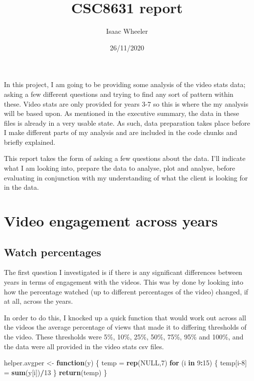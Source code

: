 \documentclass[
]{article}
\title{CSC8631 report}
\author{Isaac Wheeler}
\date{26/11/2020}
\newenvironment{Shaded}{\begin{snugshade}}{\end{snugshade}}
\newcommand{\ControlFlowTok}[1]{\textcolor[rgb]{0.13,0.29,0.53}{\textbf{#1}}}
\newcommand{\DecValTok}[1]{\textcolor[rgb]{0.00,0.00,0.81}{#1}}
\newcommand{\KeywordTok}[1]{\textcolor[rgb]{0.13,0.29,0.53}{\textbf{#1}}}
\newcommand{\NormalTok}[1]{#1}
\newcommand{\OperatorTok}[1]{\textcolor[rgb]{0.81,0.36,0.00}{\textbf{#1}}}
\newcommand{\OtherTok}[1]{\textcolor[rgb]{0.56,0.35,0.01}{#1}}
\newcommand{\StringTok}[1]{\textcolor[rgb]{0.31,0.60,0.02}{#1}}
\begin{document}
\maketitle

In this project, I am going to be providing some analysis of the video
stats data; asking a few different questions and trying to find any sort
of pattern within these. Video stats are only provided for years 3-7 so
this is where the my analysis will be based upon. As mentioned in the
executive summary, the data in these files is already in a very usable
state. As such, data preparation takes place before I make different
parts of my analysis and are included in the code chunks and briefly
explained.

This report takes the form of asking a few questions about the data.
I'll indicate what I am looking into, prepare the data to analyse, plot
and analyse, before evaluating in conjunction with my understanding of
what the client is looking for in the data.

\hypertarget{video-engagement-across-years}{%
\section{Video engagement across
years}\label{video-engagement-across-years}}

\hypertarget{watch-percentages}{%
\subsection{Watch percentages}\label{watch-percentages}}

The first question I investigated is if there is any significant
differences between years in terms of engagement with the videos. This
was by done by looking into how the percentage watched (up to different
percentages of the video) changed, if at all, across the years.

In order to do this, I knocked up a quick function that would work out
across all the videos the average percentage of views that made it to
differing thresholds of the video. These thresholds were 5\%, 10\%,
25\%, 50\%, 75\%, 95\% and 100\%, and the data were all provided in the
video stats csv files.

\begin{Shaded}
\begin{Highlighting}[]
\NormalTok{helper.avgper <-}\StringTok{ }\ControlFlowTok{function}\NormalTok{(y)}
\NormalTok{\{}
\NormalTok{  temp =}\StringTok{ }\KeywordTok{rep}\NormalTok{(}\OtherTok{NULL}\NormalTok{,}\DecValTok{7}\NormalTok{)}
  \ControlFlowTok{for}\NormalTok{ (i }\ControlFlowTok{in} \DecValTok{9}\OperatorTok{:}\DecValTok{15}\NormalTok{)}
\NormalTok{  \{}
\NormalTok{    temp[i}\DecValTok{-8}\NormalTok{] =}\StringTok{ }\KeywordTok{sum}\NormalTok{(y[i])}\OperatorTok{/}\DecValTok{13}
\NormalTok{  \}}
  \KeywordTok{return}\NormalTok{(temp)}
\NormalTok{\}}
\end{Highlighting}
\end{Shaded}
\end{document}
